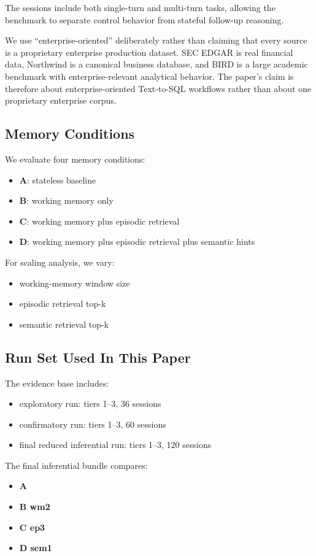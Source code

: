 \documentclass[11pt]{article}
\begin{document}
The sessions include both single-turn and multi-turn tasks, allowing the benchmark to separate control behavior from stateful follow-up reasoning.

We use ``enterprise-oriented'' deliberately rather than claiming that every source is a proprietary enterprise production dataset. SEC EDGAR is real financial data, Northwind is a canonical business database, and BIRD is a large academic benchmark with enterprise-relevant analytical behavior. The paper's claim is therefore about enterprise-oriented Text-to-SQL workflows rather than about one proprietary enterprise corpus.

\subsection{Memory Conditions}
We evaluate four memory conditions:
\begin{itemize}[leftmargin=1.5em]
  \item \textbf{A}: stateless baseline
  \item \textbf{B}: working memory only
  \item \textbf{C}: working memory plus episodic retrieval
  \item \textbf{D}: working memory plus episodic retrieval plus semantic hints
\end{itemize}

For scaling analysis, we vary:
\begin{itemize}[leftmargin=1.5em]
  \item working-memory window size
  \item episodic retrieval top-k
  \item semantic retrieval top-k
\end{itemize}

\subsection{Run Set Used In This Paper}
The evidence base includes:
\begin{itemize}[leftmargin=1.5em]
  \item exploratory run: tiers 1--3, 36 sessions
  \item confirmatory run: tiers 1--3, 60 sessions
  \item final reduced inferential run: tiers 1--3, 120 sessions
\end{itemize}

The final inferential bundle compares:
\begin{itemize}[leftmargin=1.5em]
  \item \textbf{A}
  \item \textbf{B wm2}
  \item \textbf{C ep3}
  \item \textbf{D sem1}
\end{itemize}
\end{document}
